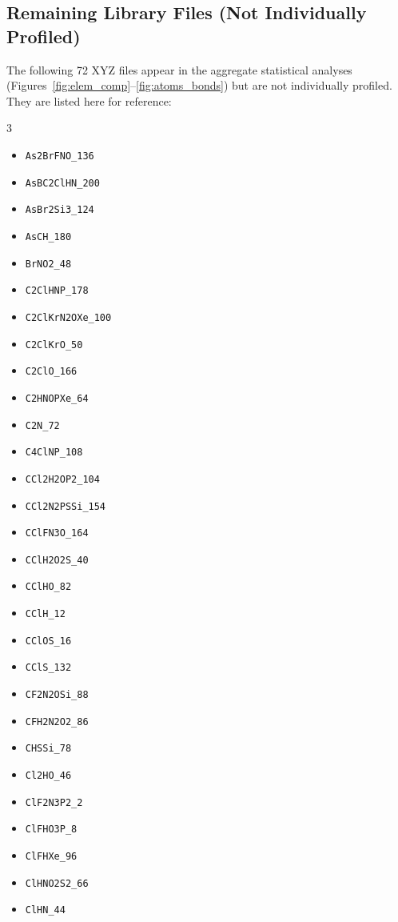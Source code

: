 \documentclass[11pt,a4paper]{article}
\begin{document}
\subsection{Remaining Library Files (Not Individually Profiled)}

The following 72 XYZ files appear in the aggregate statistical analyses
(Figures~\ref{fig:elem_comp}--\ref{fig:atoms_bonds}) but are not
individually profiled.  They are listed here for reference:

\begin{multicols}{3}
\small
\begin{itemize}[nosep,leftmargin=1em]
  \item \texttt{As2BrFNO\_136}
  \item \texttt{AsBC2ClHN\_200}
  \item \texttt{AsBr2Si3\_124}
  \item \texttt{AsCH\_180}
  \item \texttt{BrNO2\_48}
  \item \texttt{C2ClHNP\_178}
  \item \texttt{C2ClKrN2OXe\_100}
  \item \texttt{C2ClKrO\_50}
  \item \texttt{C2ClO\_166}
  \item \texttt{C2HNOPXe\_64}
  \item \texttt{C2N\_72}
  \item \texttt{C4ClNP\_108}
  \item \texttt{CCl2H2OP2\_104}
  \item \texttt{CCl2N2PSSi\_154}
  \item \texttt{CClFN3O\_164}
  \item \texttt{CClH2O2S\_40}
  \item \texttt{CClHO\_82}
  \item \texttt{CClH\_12}
  \item \texttt{CClOS\_16}
  \item \texttt{CClS\_132}
  \item \texttt{CF2N2OSi\_88}
  \item \texttt{CFH2N2O2\_86}
  \item \texttt{CHSSi\_78}
  \item \texttt{Cl2HO\_46}
  \item \texttt{ClF2N3P2\_2}
  \item \texttt{ClFHO3P\_8}
  \item \texttt{ClFHXe\_96}
  \item \texttt{ClHNO2S2\_66}
  \item \texttt{ClHN\_44}

\end{itemize}
\end{multicols}
\end{document}
